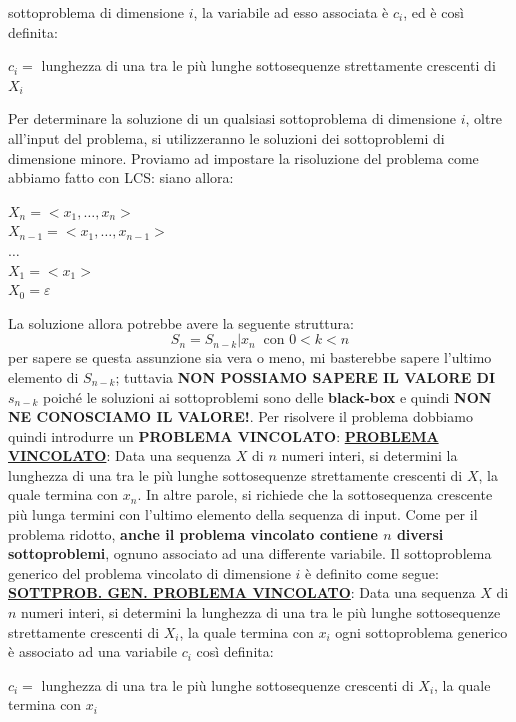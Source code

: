 \documentclass[12pt]{article}
\begin{document}
sottoproblema di dimensione $i$, la variabile ad esso associata è $c_i$, ed è così definita:
\begin{center}
    $c_i =$ lunghezza di una tra le più lunghe sottosequenze strettamente crescenti di $X_i$
\end{center}
Per determinare la soluzione di un qualsiasi sottoproblema di dimensione $i$, oltre all'input del problema, si utilizzeranno le soluzioni dei sottoproblemi di dimensione minore.
Proviamo ad impostare la risoluzione del problema come abbiamo fatto con LCS: siano allora:
\begin{center}
    $X_n = <x_1, \dots, x_n>$ \\
    $X_{n-1} = <x_1, \dots, x_{n-1}>$ \\
    $\dots$ \\
    $X_1 = <x_1>$ \\
    $X_0 = \varepsilon$
\end{center}
La soluzione allora potrebbe avere la seguente struttura:
$$S_n =S_{n-k}|x_n \; \; \textrm{con } 0 < k < n$$
per sapere se questa assunzione sia vera o meno, mi basterebbe sapere l'ultimo elemento di $S_{n-k}$; tuttavia
\textbf{NON POSSIAMO SAPERE IL VALORE DI $s_{n-k}$} poiché le soluzioni ai sottoproblemi sono delle \textbf{black-box} e quindi
\textbf{NON NE CONOSCIAMO IL VALORE!}. Per risolvere il problema dobbiamo quindi introdurre un \textbf{PROBLEMA VINCOLATO}: \newline
\textbf{\underline{PROBLEMA VINCOLATO}}: Data una sequenza $X$ di $n$ numeri interi, si determini la lunghezza di una tra le più lunghe sottosequenze strettamente crescenti
di $X$, la quale termina con $x_n$. \newline
In altre parole, si richiede che la sottosequenza crescente più lunga termini con l'ultimo elemento della sequenza di input.
Come per il problema ridotto, \textbf{anche il problema vincolato contiene $n$ diversi sottoproblemi}, ognuno associato ad una differente variabile.
Il sottoproblema generico del problema vincolato di dimensione $i$ è definito come segue: \newline
\textbf{\underline{SOTTPROB. GEN. PROBLEMA VINCOLATO}}: Data una sequenza $X$ di $n$ numeri interi, si determini la lunghezza di una tra le più lunghe sottosequenze strettamente crescenti di $X_i$, la quale termina con $x_i$ \newline
ogni sottoproblema generico è associato ad una variabile $c_i$ così definita:
\begin{center}
    $c_i = $ lunghezza di una tra le più lunghe sottosequenze crescenti di $X_i$, la quale termina con $x_i$
\end{center}
\end{document}
